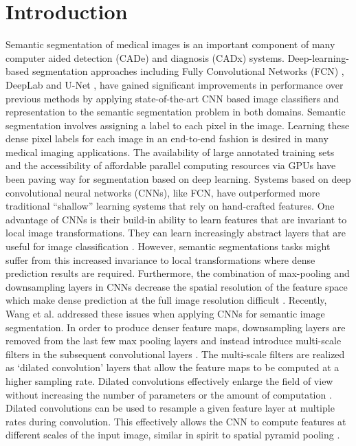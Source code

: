 \documentclass[a4paper]{mva_style}
\begin{document}
\section{Introduction}
\label{sec:intro}
Semantic segmentation of medical images is an  important component of many computer aided detection (CADe) and diagnosis (CADx) systems. Deep-learning-based segmentation approaches including Fully Convolutional Networks (FCN) \cite{long2015fully}, DeepLab \cite{chen2014semantic} and U-Net \cite{ronneberger2015unet}, have gained significant improvements in performance over previous methods by applying state-of-the-art CNN based image classifiers and representation to the semantic segmentation problem in both domains. Semantic segmentation involves assigning a label to each pixel in the image. Learning these dense pixel labels for each image in an end-to-end fashion is desired in many medical imaging applications. The availability of large annotated training sets and the accessibility of affordable parallel computing resources via GPUs have been paving way for segmentation based on deep learning. Systems based on deep convolutional neural networks (CNNs), like FCN, have outperformed more traditional ``shallow'' learning systems that rely on hand-crafted features. One advantage of CNNs is their build-in ability to learn features that are invariant to local image transformations. They can learn increasingly abstract layers that are useful for image classification \cite{zeiler2014visualizing,chen2016deeplab}. However, semantic segmentations tasks might suffer from this increased invariance to local transformations where dense prediction results are required. Furthermore, the combination of max-pooling and downsampling layers in CNNs decrease the spatial resolution of the feature space which make dense prediction at the full image resolution difficult \cite{long2015fully}. Recently, Wang et al. \cite{chen2016deeplab} addressed these issues when applying CNNs for semantic image segmentation. In order to produce denser feature maps, downsampling layers are removed from the last few max pooling layers and instead introduce multi-scale filters in the subsequent convolutional layers \cite{chen2016deeplab}. The multi-scale filters are realized as `dilated convolution' layers that allow the feature maps to be computed at a higher sampling rate. Dilated convolutions effectively enlarge the field of view without increasing the number of parameters or the amount of computation \cite{chen2016deeplab}. Dilated convolutions can be used to resample a given feature layer at multiple rates during convolution. This effectively allows the CNN to compute features at different scales of the input image, similar in spirit to spatial pyramid pooling \cite{he2014spatial}. \\
\end{document}
